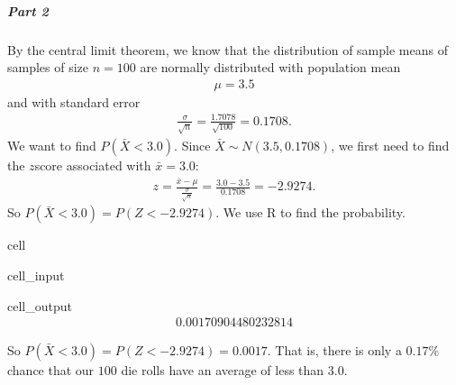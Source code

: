 \documentclass[letterpaper,10pt,english]{jupyterBook}
\begin{document}
\subparagraph{Part 2}
\label{\detokenize{Ch4 The Normal Distribution and the Central Limit Theorem/4.4 The Central Limit Theorem for Means:part-2}}
\sphinxAtStartPar
By the central limit theorem, we know that the distribution of sample means of samples of size \(n = 100\) are normally distributed with population mean
\begin{equation*}
\begin{split} \mu = 3.5 \end{split}
\end{equation*}
\sphinxAtStartPar
and with standard error
\begin{equation*}
\begin{split} \frac{\sigma}{\sqrt{n}} = \frac{1.7078}{\sqrt{100}} = 0.1708. \end{split}
\end{equation*}
\sphinxAtStartPar
We want to find \(P(\bar{X} < 3.0)\). Since \(\bar{X} \sim N(3.5, 0.1708)\), we first need to find the \(z\)\sphinxhyphen{}score associated with \(\bar{x} = 3.0\):
\begin{equation*}
\begin{split} z = \frac{\bar{x} - \mu}{\frac{\sigma}{\sqrt{n}}} = \frac{3.0 - 3.5}{0.1708} = -2.9274. \end{split}
\end{equation*}
\sphinxAtStartPar
So \(P(\bar{X} < 3.0) = P(Z < -2.9274)\). We use R to find the probability.

\begin{sphinxuseclass}{cell}\begin{sphinxVerbatimInput}

\begin{sphinxuseclass}{cell_input}
\begin{sphinxVerbatim}[commandchars=\\\{\}]
\end{sphinxVerbatim}

\end{sphinxuseclass}\end{sphinxVerbatimInput}
\begin{sphinxVerbatimOutput}

\begin{sphinxuseclass}{cell_output}\begin{equation*}
\begin{split}0.00170904480232814\end{split}
\end{equation*}
\end{sphinxuseclass}\end{sphinxVerbatimOutput}

\end{sphinxuseclass}
\sphinxAtStartPar
So \(P(\bar{X} < 3.0) = P(Z < -2.9274) = 0.0017\). That is, there is only a \(0.17\%\) chance that our \(100\) die rolls have an average of less than \(3.0\).
\end{document}
